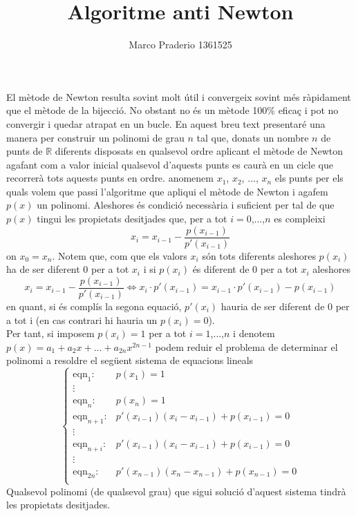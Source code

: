 \documentclass[a4paper,10pt]{article}
\title{Algoritme anti Newton}
\author{Marco Praderio 1361525}
\date{}
\renewcommand{\*}{\cdot}
\newcommand{\R}{\mathbb{R}}
\begin{document}
\maketitle
El mètode de Newton resulta sovint molt útil i convergeix sovint més ràpidament que el mètode de la bijecció.
No obstant no és un mètode 100\% eficaç i pot no convergir i quedar atrapat en un bucle.
En aquest breu text presentaré una manera per construir un polinomi de grau $n$ tal que, donats un nombre $n$ de punts de $\R$ diferents disposats en qualsevol ordre
aplicant el mètode de Newton agafant com a valor inicial qualsevol d'aquests punts es caurà en un cicle que recorrerà tots aquests punts en ordre.
anomenem $x_1$, $x_2$, $\dots$, $x_n$ els punts per els quals volem que passi l'algoritme que apliqui el mètode de Newton i agafem
$p(x)$ un polinomi.
Aleshores és condició necessària i suficient per tal de que $p(x)$ tingui les propietats desitjades que, per a tot $i=0$,$\dots$,$n$
es compleixi
\begin{equation*}
x_i=x_{i-1}-\frac{p(x_{i-1})}{p'(x_{i-1})}
\end{equation*}
on $x_0=x_n$.
Notem que, com que els valors $x_i$ són tots diferents aleshores $p(x_i)$ ha de ser diferent 0 per a tot $x_i$ i si $p(x_i)$ és diferent de 0 per a tot $x_i$ aleshores
\begin{equation*}
x_i=x_{i-1}-\frac{p(x_{i-1})}{p'(x_{i-1})} \Leftrightarrow x_i\*p'(x_{i-1})=x_{i-1}\*p'(x_{i-1})-p(x_{i-1})
\end{equation*}
en quant, si és complís la segona equació, $p'(x_i)$ hauria de ser diferent de 0 per a tot i (en cas contrari hi hauria un $p(x_i)=0$).\\
Per tant, si imposem $p(x_i)=1$ per a tot $i=1$,$\dots$,$n$ i denotem $p(x)=a_1+a_2x+...+a_{2n}x^{2n-1}$ podem reduir el problema de determinar el polinomi a resoldre
el següent sistema de equacions lineals
\begin{equation*}
\begin{cases}
\text{eqn}_1: & p(x_1)=1 \\
\vdots & \phantom{.}\\
\text{eqn}_n:	& p(x_n)=1\\
\text{eqn}_{n+1}: & p'(x_{i-1})(x_i-x_{i-1})+p(x_{i-1})=0\\
\vdots & \phantom{.}\\
\text{eqn}_{n+i}: & p'(x_{i-1})(x_i-x_{i-1})+p(x_{i-1})=0\\
\vdots & \phantom{.}\\
\text{eqn}_{2n}: & p'(x_{n-1})(x_n-x_{n-1})+p(x_{n-1})=0\\
\end{cases}
\end{equation*}
Qualsevol polinomi (de qualsevol grau) que sigui solució d'aquest sistema tindrà les propietats desitjades.
\end{document}
